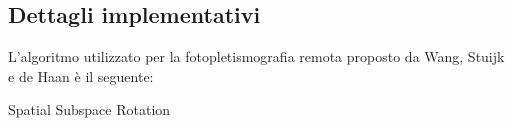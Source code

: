 \documentclass[journal,A4paper,compsoc,epsfig]{IEEEtran}
\begin{document}
    \subsection{Dettagli implementativi}
      L'algoritmo utilizzato per la fotopletismografia remota proposto da Wang, Stuijk e de Haan \cite{wang-tbe-2016} è il seguente:
      \begin{algorithm}[!htb]
        \caption{Spatial Subspace Rotation}
        \label{SpatialSubspaceRotation}

        \begin{algorithmic}[1]
          \renewcommand{\algorithmicrequire}{\textbf{Input:}}
          \renewcommand{\algorithmicensure}{\textbf{Output:}}
          
          

            


              \EndFor

            \EndIf
          \EndFor

        \end{algorithmic}
      \end{algorithm}
\end{document}
